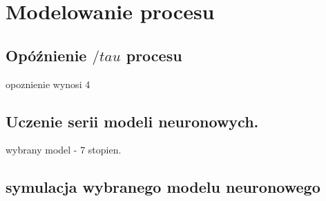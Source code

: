 \chapter{Modelowanie procesu}


\section{Opóźnienie $/tau$ procesu}
opoznienie wynosi 4

\section{Uczenie serii modeli neuronowych.}

wybrany model - 7 stopien.


\section{symulacja wybranego modelu neuronowego}

